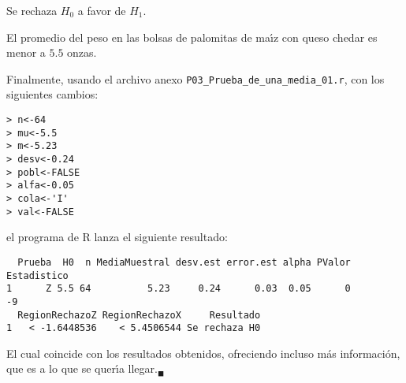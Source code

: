 \begin{solucion}
 \begin{decision}
  Se rechaza $H_0$ a favor de $H_1$.
 \end{decision}

 \begin{conclusion}
  El promedio del peso en las bolsas de palomitas de ma\'{\i}z con queso chedar es menor a $5.5$ onzas.
 \end{conclusion}

 Finalmente, usando el archivo anexo \texttt{P03\_Prueba\_de\_una\_media\_01.r}, con los siguientes cambios:
 \begin{verbatim}
> n<-64
> mu<-5.5
> m<-5.23
> desv<-0.24
> pobl<-FALSE
> alfa<-0.05
> cola<-'I'
> val<-FALSE
 \end{verbatim}
 \vspace{-0.5cm}
 el programa de R lanza el siguiente resultado:
 \begin{verbatim}
  Prueba  H0  n MediaMuestral desv.est error.est alpha PValor Estadistico
1      Z 5.5 64          5.23     0.24      0.03  0.05      0          -9
  RegionRechazoZ RegionRechazoX     Resultado
1   < -1.6448536    < 5.4506544 Se rechaza H0
 \end{verbatim}
 \vspace{-0.5cm}
 El cual coincide con los resultados obtenidos, ofreciendo incluso m\'as informaci\'on, que es a lo que se quer\'{\i}a llegar.${}_{\blacksquare}$
\end{solucion}
